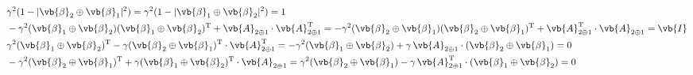 \begin{align*}
	 & \gamma^2 (1 - |\vb{\beta}_2 \oplus \vb{\beta}_1|^2) = \gamma^2 (1 - |\vb{\beta}_1 \oplus \vb{\beta}_2|^2) = 1                                                                                                                                                                                                        \\
	 & -\gamma^2 (\vb{\beta}_1 \oplus \vb{\beta}_2)(\vb{\beta}_1 \oplus \vb{\beta}_2)^\mathrm{T} + \vb{A}_{2 \oplus 1} \cdot \vb{A}_{2 \oplus 1}^\mathrm{T} = -\gamma^2 (\vb{\beta}_2 \oplus \vb{\beta}_1)(\vb{\beta}_2 \oplus \vb{\beta}_1)^\mathrm{T} + \vb{A}_{2 \oplus 1}^\mathrm{T} \cdot \vb{A}_{2 \oplus 1} = \vb{I} \\
	 & \gamma^2 (\vb{\beta}_1 \oplus \vb{\beta}_2)^\mathrm{T} - \gamma (\vb{\beta}_2 \oplus \vb{\beta}_1)^\mathrm{T} \cdot \vb{A}_{2 \oplus 1}^\mathrm{T} = -\gamma^2 (\vb{\beta}_1 \oplus \vb{\beta}_2) + \gamma \, \vb{A}_{2 \oplus 1} \cdot (\vb{\beta}_2 \oplus \vb{\beta}_1) = 0                                       \\
	 & -\gamma^2 (\vb{\beta}_2 \oplus \vb{\beta}_1)^\mathrm{T} + \gamma (\vb{\beta}_1 \oplus \vb{\beta}_2)^\mathrm{T} \cdot \vb{A}_{2 \oplus 1} = \gamma^2 (\vb{\beta}_2 \oplus \vb{\beta}_1) - \gamma \, \vb{A}_{2 \oplus 1}^\mathrm{T} \cdot (\vb{\beta}_1 \oplus \vb{\beta}_2) = 0
\end{align*}

